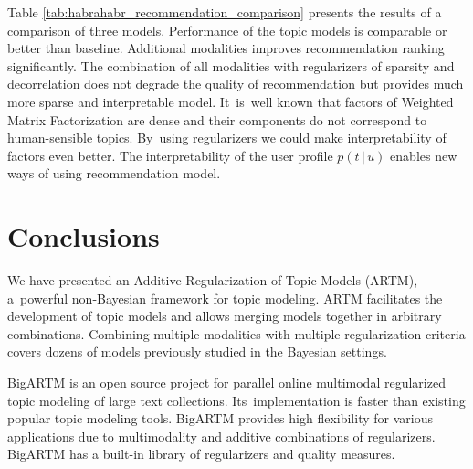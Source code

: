 \documentclass{sig-alternate-2013}
\newcommand{\cond}{\mspace{3mu}{|}\mspace{3mu}}
\begin{document}
Table \ref{tab:habrahabr_recommendation_comparison} presents the results of a comparison of three models.
Performance of the topic models is comparable or better than baseline.
Additional modalities improves recommendation ranking significantly.
The combination of all modalities with regularizers of sparsity and decorrelation
does not degrade the quality of recommendation but provides much more sparse and interpretable model.
It~is~well known that factors of Weighted Matrix Factorization are dense and their components do not correspond to human-sensible topics.
By~using regularizers we could make interpretability of factors even better.
The interpretability of the user profile $p(t\cond u)$ enables new ways of using recommendation model.


%


\section{Conclusions}
\label{sec:Conclusions}
We have presented an Additive Regularization of Topic Models (ARTM),
a~powerful non-Bayesian framework for topic modeling.
ARTM facilitates the development of topic models
and allows merging models together in arbitrary combinations.
Combining multiple modalities with multiple regularization criteria
covers dozens of models previously studied in the Bayesian settings.

\mbox{BigARTM} is an open source project
for parallel online multimodal regularized topic modeling of large text collections.
Its~implementation is faster than existing popular topic modeling tools.
\mbox{BigARTM} provides high flexibility for various applications due to
multimodality and additive combinations of regularizers.
\mbox{BigARTM} has a built-in library of regularizers and quality measures.
\end{document}
